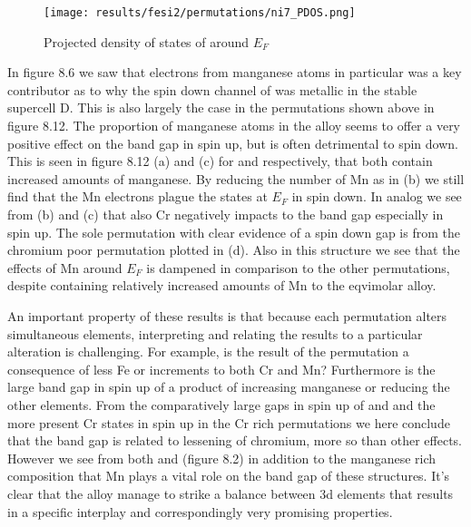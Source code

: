 \begin{figure}[H]
	\centering
	\texttt{[image: results/fesi2/permutations/ni7\_PDOS.png]}
	\caption{Projected density of states of  around $E_F$}
\end{figure}

In figure 8.6 we saw that electrons from manganese atoms in particular was a key contributor as to why the spin down channel of  was metallic in the stable supercell D. This is also largely the case in the permutations shown above in figure 8.12. The proportion of manganese atoms in the alloy seems to offer a very positive effect on the band gap in spin up, but is often detrimental to spin down. This is seen in figure 8.12 (a) and (c) for  and  respectively, that both contain increased amounts of manganese. By reducing the number of Mn as in (b) we still find that the Mn electrons plague the states at $E_F$ in spin down. In analog we see from (b) and (c) that also Cr negatively impacts to the band gap especially in spin up. The sole permutation with clear evidence of a spin down gap is from the chromium poor permutation plotted in (d). Also in this structure we see that the effects of Mn around $E_F$ is dampened in comparison to the other permutations, despite containing relatively increased amounts of Mn to the eqvimolar alloy.  

An important property of these results is that because each permutation alters simultaneous elements, interpreting and relating the results to a particular alteration is challenging. For example, is the result of the  permutation a consequence of less Fe or increments to both Cr and Mn? Furthermore is the large band gap in spin up of  a product of increasing manganese or reducing the other elements. From the comparatively large gaps in spin up of  and  and the more present Cr states in spin up in the Cr rich permutations we here conclude that the band gap is related to lessening of chromium, more so than other effects. However we see from both  and  (figure 8.2) in addition to the manganese rich composition that Mn plays a vital role on the band gap of these structures. It's clear that the  alloy manage to strike a balance between 3d elements that results in a specific interplay and correspondingly very promising properties. 


